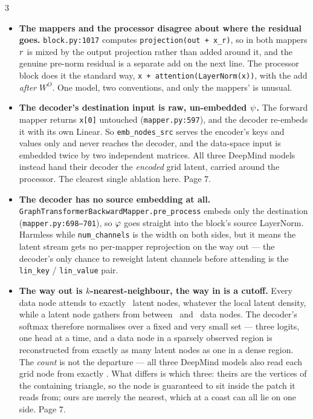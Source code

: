 \documentclass[11pt,landscape]{article}
\begin{document}
\begin{multicols}{3}
\begin{itemize}[leftmargin=1.1em]
    \item \textbf{The mappers and the processor disagree about where the
      residual goes.}
      \texttt{block.py:1017} computes \texttt{projection(out + x\_r)}, so in both
      mappers $r$ is mixed by the output projection rather than added around
      it, and the genuine pre-norm residual is a separate add on the next line.
      The processor block does it the standard way,
      \texttt{x + attention(LayerNorm(x))}, with the add \emph{after} $W^O$.  One
      model, two conventions, and only the mappers' is unusual.

    \item \textbf{The decoder's destination input is raw, un-embedded $\psi$.}
      The forward mapper returns \texttt{x[0]} untouched
      (\texttt{mapper.py:597}), and the decoder re-embeds it with its own Linear.
      So \texttt{emb\_nodes\_src} serves the encoder's keys and values only and
      never reaches the decoder, and the data-space input is embedded twice by
      two independent matrices.  All three DeepMind models instead hand their
      decoder the \emph{encoded} grid latent, carried around the processor.  The
      clearest single ablation here.  Page 7.

    \item \textbf{The decoder has no source embedding at all.}
      \texttt{GraphTransformerBackwardMapper.pre\_process} embeds only the
      destination (\texttt{mapper.py:698--701}), so $\varphi$ goes straight
      into the block's source LayerNorm.  Harmless while \texttt{num\_channels}
      is the width on both sides, but it means the latent stream gets no
      per-mapper reprojection on the way out --- the decoder's only chance to
      reweight latent channels before attending is the \texttt{lin\_key} /
      \texttt{lin\_value} pair.

    \item \textbf{The way out is $k$-nearest-neighbour, the way in is a cutoff.}
      Every data node attends to exactly \valdecdegmax\ latent nodes, whatever
      the local latent density, while a latent node gathers from between
      \valdegmin\ and \valdegmax\ data nodes.  The decoder's softmax therefore
      normalises over a fixed and very small set --- three logits, one head at a
      time, and a data node in a sparsely observed region is reconstructed from
      exactly as many latent nodes as one in a dense region.
      The \emph{count} is not the departure --- all three DeepMind models also read
      each grid node from exactly \dmdecdeg.  What differs is which three: theirs
      are the vertices of the containing triangle, so the node is guaranteed to sit
      inside the patch it reads from; ours are merely the nearest, which at a coast
      can all lie on one side.  Page 7.


\end{itemize}
\end{multicols}
\end{document}
